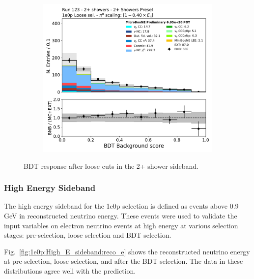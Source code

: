 \begin{figure}[H]
    \begin{center}
    \begin{subfigure}{0.4\textwidth}
    \includegraphics[width=1.00\textwidth]{Sidebands/Figures/TwoShr_1e0pSel_newSamples/bkg_score_loose.pdf}
    \end{subfigure}
    \caption{\label{fig:sb:1eZp:twopshr:loose:bdt} BDT response after \zpsel loose cuts in the 2+ shower sideband.}
    \end{center}
\end{figure}


\subsubsection{High Energy Sideband}
\label{sec:sideband:1e0p:he}
The high energy sideband for the 1e0p selection is defined as events above 0.9 GeV in reconstructed neutrino energy.  These events were used to validate the input variables on electron neutrino events at high energy at various selection stages: pre-selection, loose selection and BDT selection. 

Fig.~\ref{fig:1e0p:High_E_sideband:reco_e} shows the reconstructed neutrino energy at pre-selection, loose selection, and after the BDT selection. The data in these distributions agree well with the prediction. 

